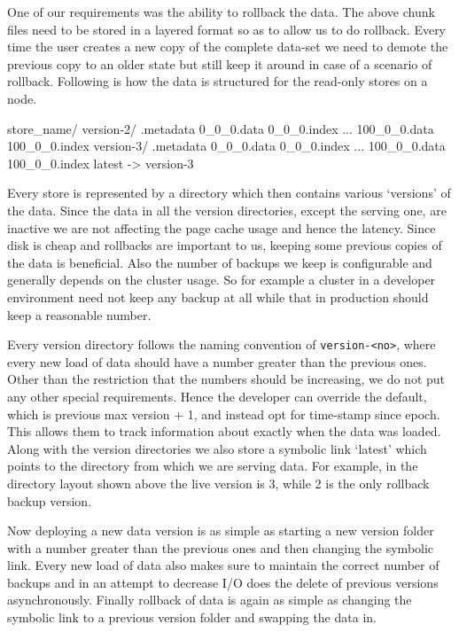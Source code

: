 \documentclass[10pt,twocolumn,preprint,natbib,authoryear]{sigplanconf}
\begin{document}
One of our requirements was the ability to rollback the data. The above chunk files need to be stored in a layered format so as to allow us to do rollback. Every time the user creates a new copy of the complete data-set we need to demote the previous copy to an older state but still keep it around in case of a scenario of rollback. Following is how the data is structured for the read-only stores on a \projectname{} node. 

\scriptsize
\begin{verbatimtab}
store_name/
  version-2/
    .metadata
    0_0_0.data
    0_0_0.index
    ...
    100_0_0.data
    100_0_0.index
  version-3/
    .metadata
    0_0_0.data
    0_0_0.index
    ...
    100_0_0.data
    100_0_0.index
  latest -> version-3
\end{verbatimtab}
\normalsize

Every store is represented by a directory which then contains various `versions' of the data. Since the data in all the version directories, except the serving one, are inactive we are not affecting the page cache usage and hence the latency. Since disk is cheap and rollbacks are important to us, keeping some previous copies of the data is beneficial. Also the number of backups we keep is configurable and generally depends on the cluster usage. So for example a cluster in a developer environment need not keep any backup at all while that in production should keep a reasonable number.

Every version directory follows the naming convention of \verb=version-<no>=, where every new load of data should have a number greater than the previous ones. Other than the restriction that the numbers should be increasing, we do not put any other special requirements. Hence the developer can override the default, which is previous max version + 1, and instead opt for time-stamp since epoch. This allows them to track information about exactly when the data was loaded. Along with the version directories we also store a symbolic link `latest' which points to the directory from which we are serving data. For example, in the directory layout shown above the live version is 3, while 2 is the only rollback backup version. 

Now deploying a new data version is as simple as starting a new version folder with a number greater than the previous ones and then changing the symbolic link. Every new load of data also makes sure to maintain the correct number of backups and in an attempt to decrease I/O does the delete of previous versions asynchronously. Finally rollback of data is again as simple as changing the symbolic link to a previous version folder and swapping the data in. 
\end{document}
